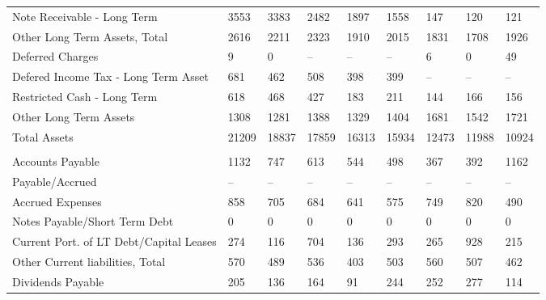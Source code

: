\documentclass[grad,numbers]{coppe}
\begin{document}
\begin{longtable}[t]{lllllllll}
  \hspace{1em}Note Receivable - Long Term & 3553 & 3383 & 2482 & 1897 & 1558 & 147 & 120 & 121\\
  \hspace{1em}Other Long Term Assets, Total & 2616 & 2211 & 2323 & 1910 & 2015 & 1831 & 1708 & 1926\\
  \hspace{1em}\hspace{1em}Deferred Charges & 9 & 0 & -- & -- & -- & 6 & 0 & 49\\
  \hspace{1em}\hspace{1em}Defered Income Tax - Long Term Asset & 681 & 462 & 508 & 398 & 399 & -- & -- & --\\
  \hspace{1em}\hspace{1em}Restricted Cash - Long Term & 618 & 468 & 427 & 183 & 211 & 144 & 166 & 156\\
  \hspace{1em}\hspace{1em}Other Long Term Assets & 1308 & 1281 & 1388 & 1329 & 1404 & 1681 & 1542 & 1721\\
  \hspace{1em}Total Assets & 21209 & 18837 & 17859 & 16313 & 15934 & 12473 & 11988 & 10924\\
  \addlinespace[0.3em]
  \multicolumn{9}{l}{\textbf{Liabilities}}\\
  \hspace{1em}Accounts Payable & 1132 & 747 & 613 & 544 & 498 & 367 & 392 & 1162\\
  \hspace{1em}Payable/Accrued & -- & -- & -- & -- & -- & -- & -- & --\\
  \hspace{1em}Accrued Expenses & 858 & 705 & 684 & 641 & 575 & 749 & 820 & 490\\
  \hspace{1em}Notes Payable/Short Term Debt & 0 & 0 & 0 & 0 & 0 & 0 & 0 & 0\\
  \hspace{1em}Current Port. of LT Debt/Capital Leases & 274 & 116 & 704 & 136 & 293 & 265 & 928 & 215\\
  \hspace{1em}Other Current liabilities, Total & 570 & 489 & 536 & 403 & 503 & 560 & 507 & 462\\
  \hspace{1em}\hspace{1em}Dividends Payable & 205 & 136 & 164 & 91 & 244 & 252 & 277 & 114\\

\end{longtable}
\end{document}
